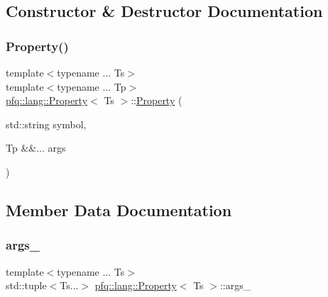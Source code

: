 \subsection{Constructor \& Destructor Documentation}
\mbox{\label{structpfq_1_1lang_1_1Property_a9adc3ecb01a6789d3fe1bee6f75dabc3}} 
\subsubsection{\texorpdfstring{Property()}{Property()}}
{\footnotesize\ttfamily template$<$typename ... Ts$>$ \\
template$<$typename ... Tp$>$ \\
\hyperlink{structpfq_1_1lang_1_1Property}{pfq\+::lang\+::\+Property}$<$ Ts $>$\+::\hyperlink{structpfq_1_1lang_1_1Property}{Property} (\begin{DoxyParamCaption}\item[{std\+::string}]{symbol,  }\item[{Tp \&\&...}]{args }\end{DoxyParamCaption})\hspace{0.3cm}{\ttfamily [inline]}}



\subsection{Member Data Documentation}
\mbox{\label{structpfq_1_1lang_1_1Property_a01e0bf793226860cbafe4bea5075d507}} 
\subsubsection{\texorpdfstring{args\+\_\+}{args\_}}
{\footnotesize\ttfamily template$<$typename ... Ts$>$ \\
std\+::tuple$<$Ts...$>$ \hyperlink{structpfq_1_1lang_1_1Property}{pfq\+::lang\+::\+Property}$<$ Ts $>$\+::args\+\_\+}

\mbox{\label{structpfq_1_1lang_1_1Property_a27cdbc97fd6ffc8b92ff75599c7dce72}} 
